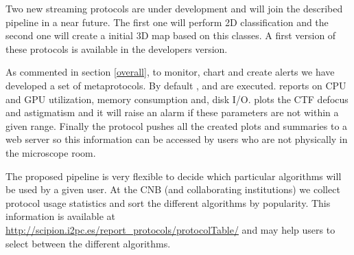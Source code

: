 Two new streaming protocols are under development and will join the described  pipeline in a near future. The first one will perform 2D classification and the second one will create a initial 3D map based on this classes. A first version of these protocols is available in the \scipion developers version.

As commented in section \ref{overall}, to monitor, chart and create alerts  we have developed a set of metaprotocols. By default ,  and  are executed.  reports on  CPU and GPU utilization, memory consumption and, disk I/O.  plots the CTF defocus and astigmatism  and it will raise an alarm if these parameters are not within a given range. Finally the  protocol pushes all the created plots and summaries to a web server 
so this information can be accessed by users who are not physically in the microscope room.

The proposed pipeline is very flexible to decide which particular algorithms will be used by a given user. At the CNB (and collaborating institutions) we collect protocol usage statistics and sort the different algorithms by popularity.  This information is available at  \url{http://scipion.i2pc.es/report_protocols/protocolTable/} and may help users to select between the different algorithms.


